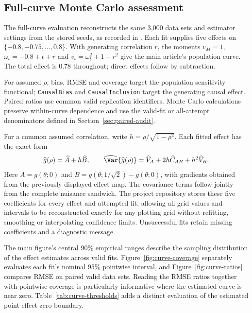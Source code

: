 \clearpage
\subsection{Full-curve Monte Carlo assessment}

The full-curve evaluation reconstructs the same 3,000 data sets and estimator settings from the stored seeds, as recorded in . Each fit supplies five effects on $\{-0.8,-0.75,\ldots,0.8\}$. With generating correlation $r$, the moments $v_M=1$, $\omega_t=-0.8+t+r$ and $v_t=\omega_t^2+1-r^2$ give the main article's population curve. The total effect is 0.78 throughout; direct effects follow by subtraction.

For assumed $\rho$, bias, RMSE and coverage target the population sensitivity functional; \texttt{CausalBias} and \texttt{CausalInclusion} target the generating causal effect. Paired ratios use common valid replication identifiers. Monte Carlo calculations preserve within-curve dependence and use the valid-fit or all-attempt denominators defined in Section~\ref{sec:paired-audit}.

For a common assumed correlation, write $h=\rho/\sqrt{1-\rho^2}$. Each fitted effect has the exact form
\[
\widehat g(\rho)=\widehat A+h\widehat B,\qquad
\widehat\Var\{\widehat g(\rho)\}
=\widehat V_A+2h\widehat C_{AB}+h^2\widehat V_B.
\]
Here $A=g(\theta;0)$ and $B=g(\theta;1/\sqrt2)-g(\theta;0)$, with gradients obtained from the previously displayed effect map. The covariance terms follow jointly from the complete nuisance sandwich. The project repository stores these five coefficients for every effect and attempted fit, allowing all grid values and intervals to be reconstructed exactly for any plotting grid without refitting, smoothing or interpolating confidence limits. Unsuccessful fits retain missing coefficients and a diagnostic message.

The main figure's central 90\% empirical ranges describe the sampling distribution of the effect estimates across valid fits. Figure~\ref{fig:curve-coverage} separately evaluates each fit's nominal 95\% pointwise interval, and Figure~\ref{fig:curve-ratios} compares RMSE on paired valid data sets. Reading the RMSE ratios together with pointwise coverage is particularly informative where the estimated curve is near zero. Table~\ref{tab:curve-thresholds} adds a distinct evaluation of the estimated point-effect zero boundary.


